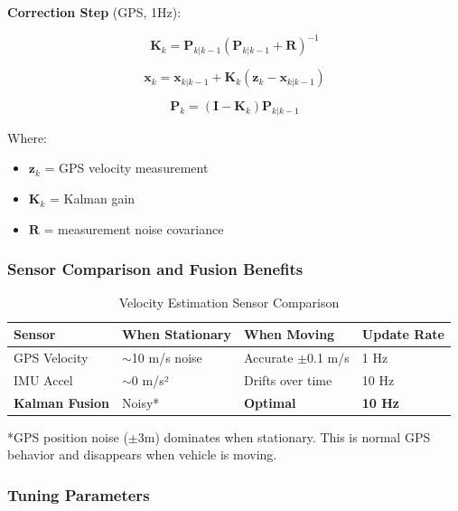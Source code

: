 \documentclass[11pt,a4paper]{article}
\begin{document}
\textbf{Correction Step} (GPS, 1Hz):

\begin{equation}
\mathbf{K}_k = \mathbf{P}_{k|k-1} (\mathbf{P}_{k|k-1} + \mathbf{R})^{-1}
\end{equation}

\begin{equation}
\mathbf{x}_k = \mathbf{x}_{k|k-1} + \mathbf{K}_k (\mathbf{z}_k - \mathbf{x}_{k|k-1})
\end{equation}

\begin{equation}
\mathbf{P}_k = (\mathbf{I} - \mathbf{K}_k) \mathbf{P}_{k|k-1}
\end{equation}

Where:
\begin{itemize}
    \item $\mathbf{z}_k$ = GPS velocity measurement
    \item $\mathbf{K}_k$ = Kalman gain
    \item $\mathbf{R}$ = measurement noise covariance
\end{itemize}

\subsubsection{Sensor Comparison and Fusion Benefits}

\begin{table}[H]
\centering
\begin{tabular}{@{}llll@{}}
\toprule
\textbf{Sensor} & \textbf{When Stationary} & \textbf{When Moving} & \textbf{Update Rate} \\
\midrule
GPS Velocity & $\sim$10 m/s noise & Accurate $\pm$0.1 m/s & 1 Hz \\
IMU Accel & $\sim$0 m/s² & Drifts over time & 10 Hz \\
\textbf{Kalman Fusion} & Noisy* & \textbf{Optimal} & \textbf{10 Hz} \\
\bottomrule
\end{tabular}
\caption{Velocity Estimation Sensor Comparison}
\end{table}

*GPS position noise ($\pm3$m) dominates when stationary. This is normal GPS behavior and disappears when vehicle is moving.

\subsubsection{Tuning Parameters}
\end{document}
